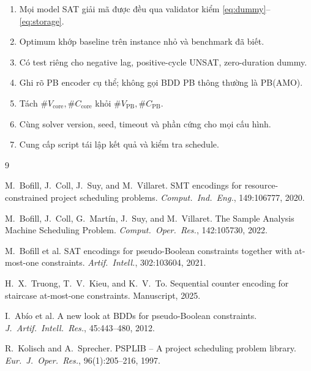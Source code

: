 \documentclass[11pt,a4paper]{article}
\theoremstyle{remark}
\begin{document}
\begin{enumerate}
  \item Mọi model SAT giải mã được đều qua validator kiểm \eqref{eq:dummy}--\eqref{eq:storage}.
  \item Optimum khớp baseline trên instance nhỏ và benchmark đã biết.
  \item Có test riêng cho negative lag, positive-cycle UNSAT, zero-duration dummy.
  \item Ghi rõ PB encoder cụ thể; không gọi BDD PB thông thường là PB(AMO).
  \item Tách $\#V_\mathrm{core},\#C_\mathrm{core}$ khỏi $\#V_\mathrm{PB},\#C_\mathrm{PB}$.
  \item Cùng solver version, seed, timeout và phần cứng cho mọi cấu hình.
  \item Cung cấp script tái lập kết quả và kiểm tra schedule.
\end{enumerate}

\begin{thebibliography}{9}

M.~Bofill, J.~Coll, J.~Suy, and M.~Villaret.
SMT encodings for resource-constrained project scheduling problems.
\emph{Comput.\ Ind.\ Eng.}, 149:106777, 2020.

M.~Bofill, J.~Coll, G.~Martín, J.~Suy, and M.~Villaret.
The Sample Analysis Machine Scheduling Problem.
\emph{Comput.\ Oper.\ Res.}, 142:105730, 2022.

M.~Bofill et al.
SAT encodings for pseudo-Boolean constraints together with at-most-one constraints.
\emph{Artif.\ Intell.}, 302:103604, 2021.

H.~X.~Truong, T.~V.~Kieu, and K.~V.~To.
Sequential counter encoding for staircase at-most-one constraints.
Manuscript, 2025.

I.~Abío et al.
A new look at BDDs for pseudo-Boolean constraints.
\emph{J.\ Artif.\ Intell.\ Res.}, 45:443--480, 2012.

R.~Kolisch and A.~Sprecher.
PSPLIB -- A project scheduling problem library.
\emph{Eur.\ J.\ Oper.\ Res.}, 96(1):205--216, 1997.

\end{thebibliography}
\end{document}
